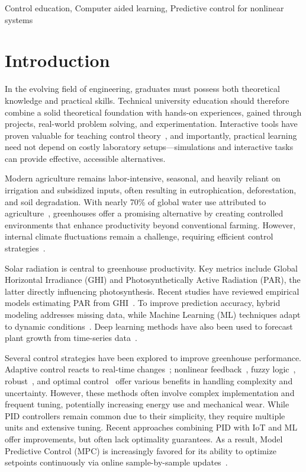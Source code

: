 \documentclass[conference]{IEEEtran}
\begin{document}
\begin{IEEEkeywords}
    Control education, Computer aided learning, Predictive control for nonlinear systems
\end{IEEEkeywords}

\section{Introduction}
In the evolving field of engineering, graduates must possess both theoretical knowledge and practical skills. Technical university education should therefore combine a solid theoretical foundation with hands-on experiences, gained through projects, real-world problem solving, and experimentation. Interactive tools have proven valuable for teaching control theory~\cite{Emami1991, Guzman2013}, and importantly, practical learning need not depend on costly laboratory setups—simulations and interactive tasks can provide effective, accessible alternatives.

Modern agriculture remains labor-intensive, seasonal, and heavily reliant on irrigation and subsidized inputs, often resulting in eutrophication, deforestation, and soil degradation. With nearly 70\% of global water use attributed to agriculture~\cite{Debroy2024}, greenhouses offer a promising alternative by creating controlled environments that enhance productivity beyond conventional farming. However, internal climate fluctuations remain a challenge, requiring efficient control strategies~\cite{Wu2019}.

Solar radiation is central to greenhouse productivity. Key metrics include Global Horizontal Irradiance (GHI) and Photosynthetically Active Radiation (PAR), the latter directly influencing photosynthesis. Recent studies have reviewed empirical models estimating PAR from GHI~\cite{NoriegaGardea2021}. To improve prediction accuracy, hybrid modeling addresses missing data, while Machine Learning (ML) techniques adapt to dynamic conditions~\cite{Iddio2020, MaLu2022}. Deep learning methods have also been used to forecast plant growth from time-series data~\cite{Yasrab2021}.

Several control strategies have been explored to improve greenhouse performance. Adaptive control reacts to real-time changes~\cite{Tian2022}; nonlinear feedback~\cite{Bood2023}, fuzzy logic~\cite{smartcities7030055}, robust~\cite{Zhang2021}, and optimal control~\cite{Debroy2024, SVENSEN2024108578} offer various benefits in handling complexity and uncertainty. However, these methods often involve complex implementation and frequent tuning, potentially increasing energy use and mechanical wear. While PID controllers remain common due to their simplicity, they require multiple units and extensive tuning. Recent approaches combining PID with IoT and ML~\cite{Wang2024} offer improvements, but often lack optimality guarantees. As a result, Model Predictive Control (MPC) is increasingly favored for its ability to optimize setpoints continuously via online sample-by-sample updates~\cite{Hu2022}.
\end{document}
